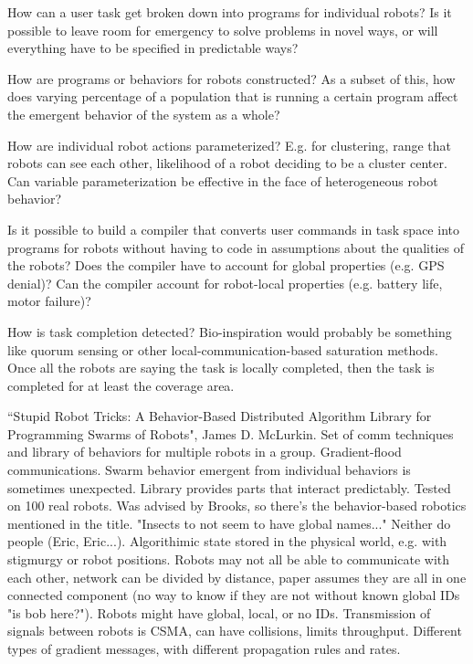 \documentclass[]{article}
\begin{document}
How can a user task get broken down into programs for individual robots?
Is it possible to leave room for emergency to solve problems in novel ways, or will everything have to be specified in predictable ways?

How are programs or behaviors for robots constructed? 
As a subset of this, how does varying percentage of a population that is running a certain program affect the emergent behavior of the system as a whole? 

How are individual robot actions parameterized? 
E.g. for clustering, range that robots can see each other, likelihood of a robot deciding to be a cluster center.  
Can variable parameterization be effective in the face of heterogeneous robot behavior?

Is it possible to build a compiler that converts user commands in task space into programs for robots without having to code in assumptions about the qualities of the robots? Does the compiler have to account for global properties (e.g. GPS denial)? Can the compiler account for robot-local properties (e.g. battery life, motor failure)?

How is task completion detected? Bio-inspiration would probably be something like quorum sensing or other local-communication-based saturation methods. Once all the robots are saying the task is locally completed, then the task is completed for at least the coverage area. 

``Stupid Robot Tricks: A Behavior-Based Distributed Algorithm Library for Programming Swarms of Robots", \cite{mclurkin2004stupid} James D. McLurkin. Set of comm techniques and library of behaviors for multiple robots in a group. Gradient-flood communications. Swarm behavior emergent from individual behaviors is sometimes unexpected. Library provides parts that interact predictably. Tested on 100 real robots. Was advised by Brooks, so there's the behavior-based robotics mentioned in the title. "Insects to not seem to have global names..." Neither do people (Eric, Eric...). Algorithimic state stored in the physical world, e.g. with stigmurgy or robot positions. Robots may not all be able to communicate with each other, network can be divided by distance, paper assumes they are all in one connected component (no way to know if they are not without known global IDs "is bob here?"). Robots might have global, local, or no IDs. Transmission of signals between robots is CSMA, can have collisions, limits throughput. Different types of gradient messages, with different propagation rules and rates. 
\end{document}
